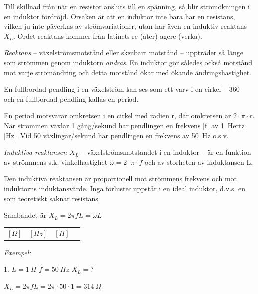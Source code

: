 Till skillnad från när en resistor ansluts till en spänning, så blir
strömökningen i en induktor fördröjd. Orsaken är att en induktor inte bara har
en resistans, vilken ju inte påverkas av strömvariationer, utan har även en
induktiv reaktans \(X_L\). Ordet reaktans kommer från latinets re (åter) agere
(verka).

\emph{Reaktans} -- växelströmsmotstånd eller skenbart motstånd -- uppträder så
länge som strömmen genom induktorn \emph{ändras}. En induktor gör således också
motstånd mot varje strömändring och detta motstånd ökar med ökande
ändringshastighet.

En fullbordad pendling i en växelström kan ses som ett varv i en cirkel -- 360\degree --
och en fullbordad pendling kallas en period.

En period motsvarar omkretsen i en cirkel med radien r, där omkretsen är
\(2 \cdot \pi  \cdot r\). När strömmen växlar 1 gång/sekund har
pendlingen en frekvens [f] av 1~Hertz [Hz]. Vid 50 växlingar/sekund har
pendlingen en frekvens av 50~Hz o.s.v.

\emph{Induktiva reaktansen \(X_L\)} -- växelströmsmotståndet i en induktor -- är
en funktion av strömmens s.k. vinkelhastighet \(\omega = 2 \cdot \pi  \cdot f\) och
av storheten av induktansen L.

Den induktiva reaktansen är proportionell mot strömmens frekvens och mot
induktorns induktansvärde. Inga förluster uppstår i en ideal induktor, d.v.s. en
som teoretiskt saknar resistans.

Sambandet är
\(X_L = 2\pi fL = \omega L\)



\begin{tabular}{llll}
 \([\Omega]\) & \([Hz]\) & \([H]\)
 \end{tabular}

\emph{Exempel:}

1. \(L = 1\ H\) \(f = 50\ Hz\) \(X_L = ?\)

\(X_L = 2\pi fL = 2\pi  \cdot 50 \cdot 1 = 314\ \Omega\)

